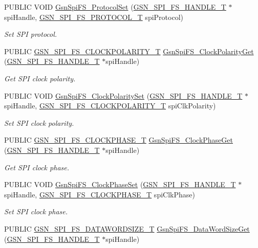 \begin{DoxyCompactItemize}
PUBLIC VOID \hyperlink{a00655_ga574267f38c56283722d26a2d9e6f2685}{GsnSpiFS\_\-ProtocolSet} (\hyperlink{a00234}{GSN\_\-SPI\_\-FS\_\-HANDLE\_\-T} $\ast$spiHandle, \hyperlink{a00655_gaa9b496d91ebb6c1e80cbd1b076c55f40}{GSN\_\-SPI\_\-FS\_\-PROTOCOL\_\-T} spiProtocol)
\begin{DoxyCompactList}\small\item\em Set SPI protocol. \end{DoxyCompactList}\item 
PUBLIC \hyperlink{a00655_ga68952a1f7c2baa0ffb682a9689229eaf}{GSN\_\-SPI\_\-FS\_\-CLOCKPOLARITY\_\-T} \hyperlink{a00655_gab631429f4a7a2ddbc8d5c37a85ea7196}{GsnSpiFS\_\-ClockPolarityGet} (\hyperlink{a00234}{GSN\_\-SPI\_\-FS\_\-HANDLE\_\-T} $\ast$spiHandle)
\begin{DoxyCompactList}\small\item\em Get SPI clock polarity. \end{DoxyCompactList}\item 
PUBLIC VOID \hyperlink{a00655_ga5b885df59ba03c81bc39d64293661427}{GsnSpiFS\_\-ClockPolaritySet} (\hyperlink{a00234}{GSN\_\-SPI\_\-FS\_\-HANDLE\_\-T} $\ast$spiHandle, \hyperlink{a00655_ga68952a1f7c2baa0ffb682a9689229eaf}{GSN\_\-SPI\_\-FS\_\-CLOCKPOLARITY\_\-T} spiClkPolarity)
\begin{DoxyCompactList}\small\item\em Set SPI clock polarity. \end{DoxyCompactList}\item 
PUBLIC \hyperlink{a00655_gaf3bb2adb7491e3d235c486d48f1b506d}{GSN\_\-SPI\_\-FS\_\-CLOCKPHASE\_\-T} \hyperlink{a00655_gadeb4e9dbec6a7632d99cb70571e3aa79}{GsnSpiFS\_\-ClockPhaseGet} (\hyperlink{a00234}{GSN\_\-SPI\_\-FS\_\-HANDLE\_\-T} $\ast$spiHandle)
\begin{DoxyCompactList}\small\item\em Get SPI clock phase. \end{DoxyCompactList}\item 
PUBLIC VOID \hyperlink{a00655_gadd121e79eb181b9fd6ef2d891d6e7fe0}{GsnSpiFS\_\-ClockPhaseSet} (\hyperlink{a00234}{GSN\_\-SPI\_\-FS\_\-HANDLE\_\-T} $\ast$spiHandle, \hyperlink{a00655_gaf3bb2adb7491e3d235c486d48f1b506d}{GSN\_\-SPI\_\-FS\_\-CLOCKPHASE\_\-T} spiClkPhase)
\begin{DoxyCompactList}\small\item\em Set SPI clock phase. \end{DoxyCompactList}\item 
PUBLIC \hyperlink{a00655_gaad2f137ab7bba85003348a4b895e435d}{GSN\_\-SPI\_\-FS\_\-DATAWORDSIZE\_\-T} \hyperlink{a00655_ga4d6382b7b36a7734dc9d928ca0d78914}{GsnSpiFS\_\-DataWordSizeGet} (\hyperlink{a00234}{GSN\_\-SPI\_\-FS\_\-HANDLE\_\-T} $\ast$spiHandle)

\end{DoxyCompactItemize}
